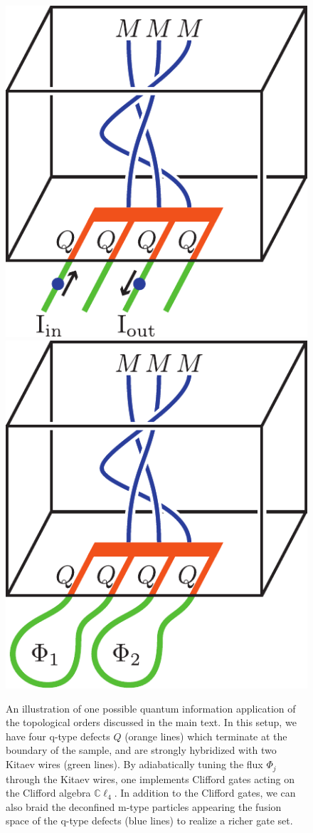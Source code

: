 \documentclass[12pt,a4paper]{article}
\newcommand{\cl}{\mathbb{C}\ell}
\begin{document}
\begin{figure}
\begin{center}
\includegraphics{QCApplication.pdf}
\includegraphics{QCApplication2.pdf}
\caption{\label{QCApplication}  
An illustration of one possible quantum information application of the topological orders discussed in the main text. 
In this setup, we have four q-type defects $Q$ (orange lines) which terminate at the boundary of the sample, and are strongly hybridized with two Kitaev wires (green lines). 
By adiabatically tuning the flux $\Phi_j$ through the Kitaev wires, one implements Clifford gates acting
on the Clifford algebra $\cl_4$. 
In addition to the Clifford gates, we can also braid the deconfined m-type particles appearing the fusion space of the q-type defects (blue lines) to realize a richer gate set. 
}
\end{center}
\end{figure}
\end{document}
